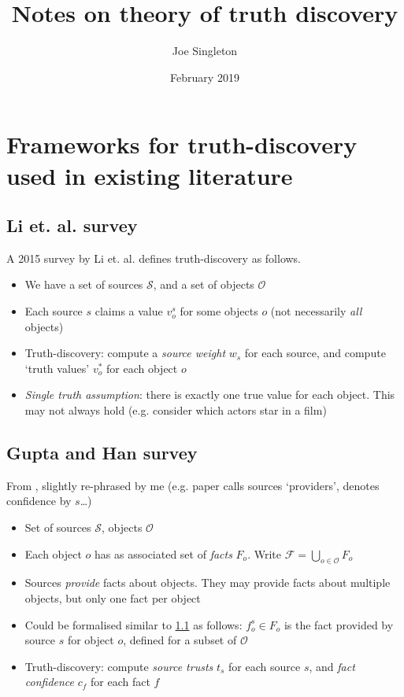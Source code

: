 \documentclass{article}
\date{February 2019}
\author{Joe Singleton}
\title{
    Notes on theory of truth discovery
}
\theoremstyle{definition} \newtheorem{definition}{Definition}
\theoremstyle{definition} \newtheorem{example}{Example}
\theoremstyle{plain} \newtheorem{axiom}{Axiom}
\theoremstyle{plain} \newtheorem*{remark}{Remark}
\theoremstyle{remark} \newtheorem*{notation}{Notation}
\theoremstyle{plain} \newtheorem{lemma}{Lemma}
\theoremstyle{plain} \newtheorem{theorem}{Theorem}
\theoremstyle{plain} \newtheorem{proposition}{Proposition}
\renewcommand{\S}{\mathcal{S}}  %
\renewcommand{\O}{\mathcal{O}}  %
\newcommand{\F}{\mathcal{F}}
\begin{document}
\maketitle

\tableofcontents

\section{Frameworks for truth-discovery used in existing literature}
\label{sec:existing_frameworks}

\subsection{Li et. al. survey}
\label{sec:li}

A 2015 survey by Li et. al. {\cite{li_survey}} defines truth-discovery as
follows.

\begin{itemize}
\item We have a set of sources $\S$, and a set of objects $\O$
\item Each source $s$ claims a value $v_{o}^{s}$ for some objects $o$ (not
necessarily \emph{all} objects)
\item Truth-discovery: compute a \emph{source weight} $w_s$ for each source,
and compute `truth values' $v_{o}^{*}$ for each object $o$
\item \emph{Single truth assumption}: there is exactly one true value for each
object. This may not always hold (e.g. consider which actors star in a film)
\end{itemize}

\subsection{Gupta and Han survey}
\label{sec:gupta}

From \cite{gupta_han_survey}, slightly re-phrased by me (e.g. paper calls
sources `providers', denotes confidence by $s$\ldots)

\begin{itemize}
\item Set of sources $\S$, objects $\O$
\item Each object $o$ has as associated set of \emph{facts} $F_o$. Write
$\F = \bigcup_{o \in \O}F_o$
\item Sources \emph{provide} facts about objects. They may provide facts about
multiple objects, but only one fact per object
\item Could be formalised similar to \ref{sec:li} as follows: $f_o^s \in F_o$
is the fact provided by source $s$ for object $o$, defined for a subset of $\O$
\item Truth-discovery: compute \emph{source trusts} $t_s$ for each source $s$,
and \emph{fact confidence} $c_f$ for each fact $f$
\end{itemize}
\end{document}
